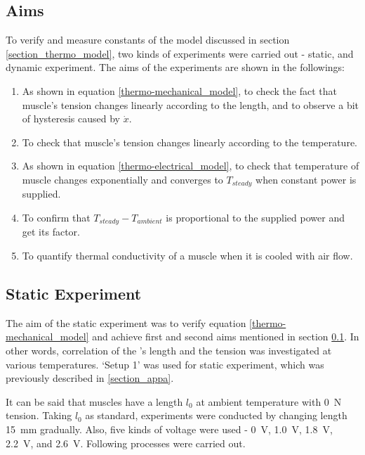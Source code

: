 \subsection{Aims}\label{section_aims}
To verify and measure constants of the model discussed in section \ref{section_thermo_model}, two kinds of experiments were carried out - static, and dynamic experiment. The aims of the experiments are shown in the followings:

\begin{enumerate} 
	\item As shown in equation \eqref{thermo-mechanical_model}, to check the fact that muscle's tension changes linearly according to the length, and to observe a bit of hysteresis caused by $\dot{x}$.
	\item To check that muscle's tension changes linearly according to the temperature.
	\item As shown in equation \eqref{thermo-electrical_model}, to check that temperature of muscle changes exponentially and converges to $T_{steady}$ when constant power is supplied.
	\item To confirm that $T_{steady}-T_{ambient}$ is proportional to the supplied power and get its factor. 
	\item To quantify thermal conductivity of a muscle when it is cooled with air flow.
\end{enumerate}




\subsection{Static Experiment} \label{subsection_static_experiment}
The aim of the static experiment was to verify equation \eqref{thermo-mechanical_model} and achieve first and second aims mentioned in section \ref{section_aims}. In other words, correlation of the \scpnospace's length and the tension was investigated at various temperatures. 
`Setup 1' was used for static experiment, which was previously described in \ref{section_appa}. %

It can be said that muscles have a length $l_{0}$ at ambient temperature with \SI{0}{\newton} tension. Taking $l_{0}$ as standard, experiments were conducted by changing length \SI{15}{\milli\meter} gradually. Also, five kinds of voltage were used - \SI{0}{\volt}, \SI{1.0}{\volt}, \SI{1.8}{\volt}, \SI{2.2}{\volt}, and \SI{2.6}{\volt}. 
Following processes were carried out.

